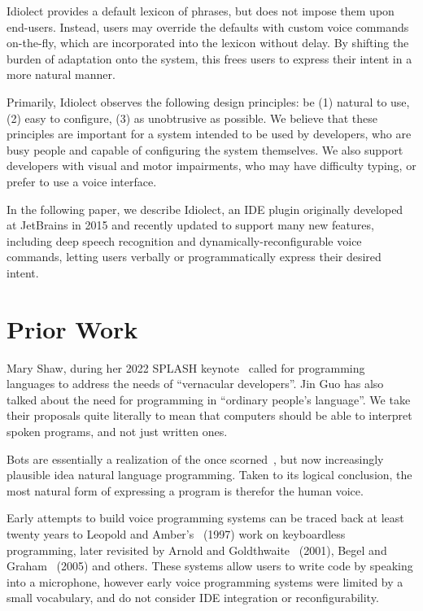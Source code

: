 \documentclass[conference]{IEEEtran}
\begin{document}
Idiolect provides a default lexicon of phrases, but does not impose them upon end-users. Instead, users may override the defaults with custom voice commands on-the-fly, which are incorporated into the lexicon without delay. By shifting the burden of adaptation onto the system, this frees users to express their intent in a more natural manner.

Primarily, Idiolect observes the following design principles: be (1) natural to use, (2) easy to configure, (3) as unobtrusive as possible. We believe that these principles are important for a system intended to be used by developers, who are busy people and capable of configuring the system themselves. We also support developers with visual and motor impairments, who may have difficulty typing, or prefer to use a voice interface.

In the following paper, we describe Idiolect, an IDE plugin originally developed at JetBrains in 2015 and recently updated to support many new features, including deep speech recognition and dynamically-reconfigurable voice commands, letting users verbally or programmatically express their desired intent.

\section{Prior Work}

Mary Shaw, during her 2022 SPLASH keynote~\cite{shaw2022myths} called for programming languages to address the needs of ``vernacular developers''. Jin Guo has also talked about the need for programming in ``ordinary people's language''. We take their proposals quite literally to mean that computers should be able to interpret spoken programs, and not just written ones.

Bots are essentially a realization of the once scorned~\cite{dijkstra1979foolishness}, but now increasingly plausible idea natural language programming. Taken to its logical conclusion, the most natural form of expressing a program is therefor the human voice.

Early attempts to build voice programming systems can be traced back at least twenty years to Leopold and Amber's~\cite{leopold1997keyboardless} (1997) work on keyboardless programming, later revisited by Arnold and Goldthwaite~\cite{arnold2000programming} (2001), Begel and Graham~\cite{begel2005spoken} (2005) and others. These systems allow users to write code by speaking into a microphone, however early voice programming systems were limited by a small vocabulary, and do not consider IDE integration or reconfigurability.
\end{document}
